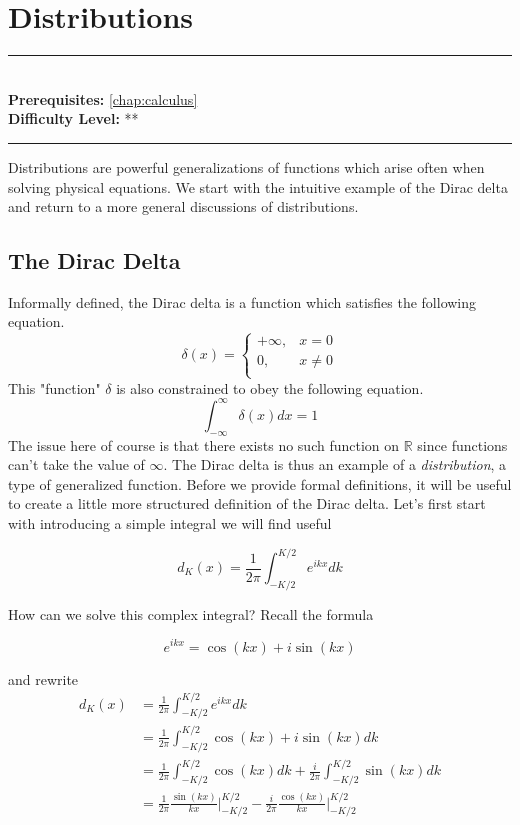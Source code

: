 \documentclass[book.tex]{subfiles}
\begin{document}
\chapter{Distributions}
\label{chap:distributions}
\noindent\rule{11cm}{0.4pt} \\
\textbf{Prerequisites:} \autoref{chap:calculus} \\
\textbf{Difficulty Level:} ** \\
\noindent\rule{11cm}{0.4pt}
\vspace{5mm}

Distributions are powerful generalizations of functions which arise often when solving physical equations. We start with the intuitive example of the Dirac delta and return to a more general discussions of distributions. 

\section{The Dirac Delta}

Informally defined, the Dirac delta is a function which satisfies the following equation.
\begin{equation}
\delta(x) = \begin{cases}
+\infty, & x = 0 \\
0, & x \neq 0 \\
\end{cases}
\end{equation}
This "function" $\delta$ is also constrained to obey the following equation.
\begin{equation}
    \int_{-\infty}^{\infty} \delta(x) dx = 1
\end{equation}
The issue here of course is that there exists no such function on $\mathbb{R}$ since functions can't take the value of $\infty$. The Dirac delta is thus an example of a \textit{distribution}, a type of generalized function. Before we provide formal definitions, it will be useful to create a little more structured definition of the Dirac delta. Let's first start with introducing a simple integral we will find useful

\begin{equation}
d_K(x) = \frac{1}{2\pi} \int_{-K/2}^{K/2} e^{ikx} dk
\end{equation}

How can we solve this complex integral? Recall the formula

\[ e^{ikx} = \cos(kx) + i \sin(kx) \]

and rewrite
\begin{align}
    d_K(x) &= \frac{1}{2\pi} \int_{-K/2}^{K/2} e^{ikx} dk \\
    &= \frac{1}{2\pi} \int_{-K/2}^{K/2} \cos(kx) + i \sin(kx) dk \\
    &= \frac{1}{2\pi} \int_{-K/2}^{K/2} \cos(kx)  dk + \frac{i}{2\pi} \int_{-K/2}^{K/2} \sin(kx) dk\\
    &= \frac{1}{2\pi} \frac{\sin(kx)}{kx} \Big|^{K/2}_{-K/2} - \frac{i}{2\pi}  \frac{\cos(kx)}{kx} \Big |_{-K/2}^{K/2} \\
\end{align}
\end{document}
